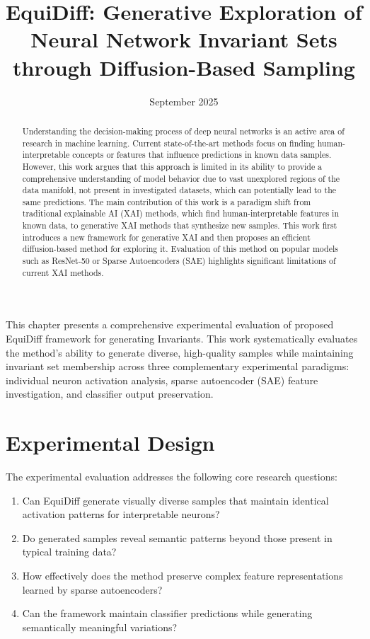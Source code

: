 \documentclass[licencjacka,en]{pracamgr}
\title{EquiDiff: Generative Exploration of Neural Network Invariant Sets through Diffusion-Based Sampling}
\date{September 2025}
\newcommand{\method}[1]{EquiDiff}  %
\newcommand{\framework}[1]{Invariants}  %
\begin{document}
\maketitle

\begin{abstract}
Understanding the decision-making process of deep neural networks is an active area of research in machine learning. Current state-of-the-art methods focus on finding human-interpretable concepts or features that influence predictions in known data samples. However, this work argues that this approach is limited in its ability to provide a comprehensive understanding of model behavior due to vast unexplored regions of the data manifold, not present in investigated datasets, which can potentially lead to the same predictions. The main contribution of this work is a paradigm shift from traditional explainable AI (XAI) methods, which find human-interpretable features in known data, to generative XAI methods that synthesize new samples. This work first introduces a new framework for generative XAI and then proposes an efficient diffusion-based method for exploring it. Evaluation of this method on popular models such as ResNet-50 or Sparse Autoencoders (SAE) highlights significant limitations of current XAI methods.
\end{abstract}

\tableofcontents








This chapter presents a comprehensive experimental evaluation of proposed \method{} framework for generating \framework{}. This work systematically evaluates the method's ability to generate diverse, high-quality samples while maintaining invariant set membership across three complementary experimental paradigms: individual neuron activation analysis, sparse autoencoder (SAE) feature investigation, and classifier output preservation.

\section{Experimental Design}

The experimental evaluation addresses the following core research questions:
\begin{enumerate}
\item Can \method{} generate visually diverse samples that maintain identical activation patterns for interpretable neurons?
\item Do generated samples reveal semantic patterns beyond those present in typical training data?
\item How effectively does the method preserve complex feature representations learned by sparse autoencoders?
\item Can the framework maintain classifier predictions while generating semantically meaningful variations?
\end{enumerate}
\end{document}
